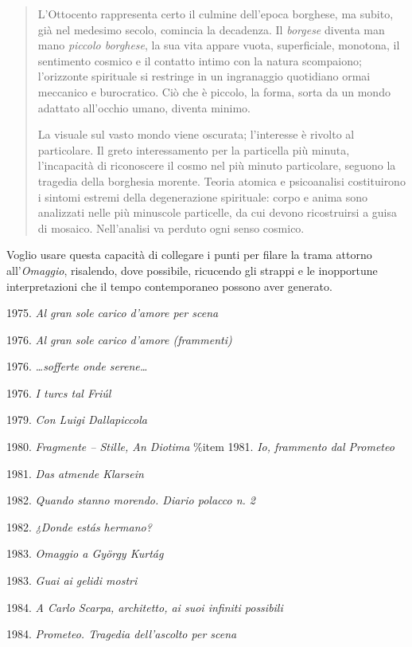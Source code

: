 \begin{quote}
L'Ottocento rappresenta certo il culmine dell'epoca borghese, ma subito, già nel medesimo secolo, comincia la decadenza. Il \emph{borgese} diventa man mano \emph{piccolo borghese}, la sua vita appare vuota, superficiale, monotona, il sentimento cosmico e il contatto intimo con la natura scompaiono; l'orizzonte spirituale si restringe in un ingranaggio quotidiano ormai meccanico e burocratico. Ciò che è piccolo, la forma, sorta da un mondo adattato all'occhio umano, diventa minimo.

La visuale sul vasto mondo viene oscurata; l'interesse è rivolto al particolare. Il greto interessamento per la particella più minuta, l'incapacità di riconoscere il cosmo nel più minuto particolare, seguono la tragedia della borghesia morente. Teoria atomica e psicoanalisi costituirono i sintomi estremi della degenerazione spirituale: corpo e anima sono analizzati nelle più minuscole particelle, da cui devono ricostruirsi a guisa di mosaico. Nell'analisi va perduto ogni senso cosmico.
\end{quote}

Voglio usare questa capacità di collegare i punti per filare la trama attorno all'\emph{Omaggio}, risalendo, dove possibile, ricucendo gli strappi e le inopportune interpretazioni che il tempo contemporaneo possono aver generato.

\begin{compactitem}
  \item 1975.	\emph{Al gran sole carico d’amore per scena}
  \item 1976.	\emph{Al gran sole carico d’amore (frammenti)}
  \item 1976.	\emph{\ldots sofferte onde serene\ldots}
  \item 1976.	\emph{I turcs tal Friúl}
  \item 1979.   \emph{Con Luigi Dallapiccola}
  \item 1980.	\emph{Fragmente – Stille, An Diotima}
  \%item 1981.	\emph{Io, frammento dal Prometeo}
  \item 1981.	\emph{Das atmende Klarsein}
  \item 1982.	\emph{Quando stanno morendo. Diario polacco n. 2}
  \item 1982.	\emph{¿Donde estás hermano?}
  \item 1983.	\emph{Omaggio a György Kurtág}
  \item 1983.	\emph{Guai ai gelidi mostri}
  \item 1984.	\emph{A Carlo Scarpa, architetto, ai suoi infiniti possibili}
  \item 1984.	\emph{Prometeo. Tragedia dell’ascolto per scena}
\end{compactitem}

